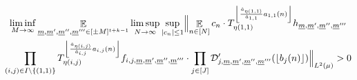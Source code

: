 \documentclass[11pt]{amsart}
\theoremstyle{definition}
\DeclareMathOperator*{\E}{\mathbb{E}}
\newcommand{\CD}{{\mathcal D}}
\newcommand{\bu}{{\mathbf{u}}}
\newcommand{\bv}{{\mathbf{v}}}
\newcommand{\um}{{\underline{m}}}
\newcommand{\1}{{\mathbf{1}}}
\newcommand{\floor}[1]{{\left \lfloor #1 \right \rfloor}}
\begin{document}
\begin{multline*}
    \liminf_{M\to\infty}\E_{\um, \um',\um'',\um'''\in [\pm M]^{t+k-1}}\limsup_{N\to\infty} \sup_{|c_n|\leq 1}\Bigl\Vert
   \E_{n\in[N]}c_n\cdot T_{\eta(1,1)}^{\floor{\frac{\hat{a}_{\eta(1,1)}}{\hat{a}_{1,1}}a_{1,1}(n)}} h_{\um,\um',\um'',\um'''}
   \\
   \prod_{(i,j)\in I\backslash\{(1,1)\}}T_{\eta(i,j)}^{\floor{\frac{\hat{a}_{\eta(i,j)}}{\hat{a}_{i,j}}a_{i,j}(n)}}f_{i,j,\um,\um',\um'',\um'''}\cdot \prod_{j\in[J]} \CD'_{j,\um,\um',\um'',\um'''}(\floor{b_j(n)})\Bigr\Vert_{L^2(\mu)}>0
\end{multline*}
\end{document}
